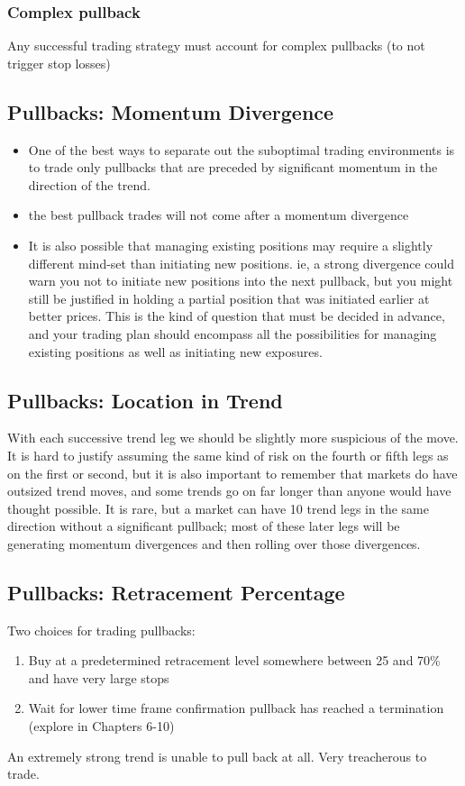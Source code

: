 \documentclass{../notes}
\begin{document}
\subsubsection{Complex pullback}
Any successful trading strategy must account for complex pullbacks (to not trigger stop losses)
\subsection{Pullbacks: Momentum Divergence}
\begin{itemize}
  \item One of the best ways to separate out the suboptimal trading environments is to trade only pullbacks that are preceded by significant momentum in the direction of the trend.
  \item the best pullback trades will not come after a momentum divergence
  \item It is also possible that managing existing positions may require a slightly different mind-set than initiating new positions. ie, a strong divergence could warn you not to initiate new positions into the next pullback, but you might still be justified in holding a partial position that was initiated earlier at better prices. This is the kind of question that must be decided in advance, and your trading plan should encompass all the possibilities for managing existing positions as well as initiating new exposures.
\end{itemize}
\subsection{Pullbacks: Location in Trend}
With each successive trend leg we should be slightly more suspicious of the move. It is hard to justify assuming the same kind of risk on the fourth or fifth legs as on the first or second, but it is also important to remember that markets do have outsized trend moves, and some trends go on far longer than anyone would have thought possible. It is rare, but a market can have 10 trend legs in the same direction without a significant pullback; most of these later legs will be generating momentum divergences and then rolling over those divergences.

\subsection{Pullbacks: Retracement Percentage}
Two choices for trading pullbacks:
\begin{enumerate}
  \item Buy at a predetermined retracement level somewhere between 25 and 70\% and have very large stops
  \item Wait for lower time frame confirmation pullback has reached a termination (explore in Chapters 6-10)
\end{enumerate}
An extremely strong trend is unable to pull back at all. Very treacherous to trade.
\end{document}
